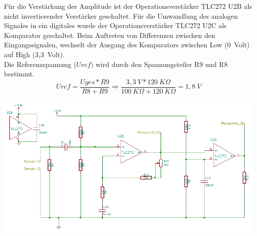 Für die Verstärkung der Amplitude ist der Operationsverstärker TLC272 U2B als nicht invertierender Verstärker geschaltet.
Für die Umwandlung des analogen Signales in ein digitales wurde der Operationsverstärker TLC272 U2C als Komparator geschaltet. Beim Auftreten von Differenzen zwischen den Eingangssignalen, wechselt der Ausgang des Komparators zwischen Low (0~Volt) auf High (3,3~Volt).\\ Die Referenzspannung (\(\displaystyle Uref)\)  wird durch den Spannungsteiler R9 und R8 bestimmt.
\onehalfspacing \\
\[\displaystyle Uref=\frac{Uges*R9}{R8+R9}\Rightarrow\frac{3,3~V*120~K\Omega}{100~K\Omega+120~K\Omega}=1,8~V \]
\singlespacing
\begin{center}
\begin{minipage}{1\textwidth}
\includegraphics[width=1\textwidth%
]{Abbildungen/Empfaenger.png}
\label{fig:Empfaengerschaltung}
\end{minipage}\\
\end{center}

